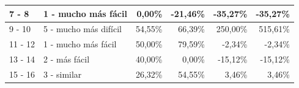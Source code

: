 \documentclass[letterpaper,12pt]{article}
\begin{document}
\begin{table}[H]
\begin{tabular}{|l|l|r|r|r|r|}
    7 - 8           & 1 - mucho más fácil                                                            & 0,00\%                                                                                                    & -21,46\%                                                                                       & -35,27\%                                                                                  & -35,27\%                                                                                 \\ \hline
    9 - 10          & 5 - mucho más difícil                                                          & 54,55\%                                                                                                   & 66,39\%                                                                                        & 250,00\%                                                                                  & 515,61\%                                                                                 \\ \hline
    11 - 12         & 1 - mucho más fácil                                                            & 50,00\%                                                                                                   & 79,59\%                                                                                        & -2,34\%                                                                                   & -2,34\%                                                                                  \\ \hline
    13 - 14         & 2 - más fácil                                                                  & 40,00\%                                                                                                   & 0,00\%                                                                                         & -15,12\%                                                                                  & -15,12\%                                                                                 \\ \hline
    15 - 16         & 3 - similar                                                                    & 26,32\%                                                                                                   & 54,55\%                                                                                        & 3,46\%                                                                                    & 3,46\%                                                                                   \\ \hline

\end{tabular}
\end{table}
\end{document}
